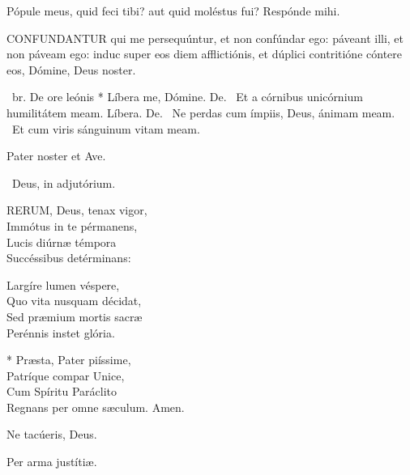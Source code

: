 


 Pópule meus, quid feci tibi? aut quid moléstus fui? Respónde mihi.


\lettrine[lines=2]{C}{ONFUNDANTUR} qui me persequúntur, et non confúndar ego: páveant illi, et non páveam ego: induc super eos diem afflictiónis, et dúplici contritióne cóntere eos, Dómine, Deus noster.

\R\ br. De ore leónis * Líbera me, Dómine. De. \V\ Et a córnibus unicórnium humilitátem meam. Líbera. De. \V\ Ne perdas cum ímpiis, Deus, ánimam meam. \R\ Et cum viris sánguinum vitam meam.



\sectionornament


Pater noster et Ave.

\V\ Deus, in adjutórium.


\lettrine[lines=2]{R}{ERUM}, Deus, tenax vigor,\\
Immótus in te pérmanens,\\
Lucis diúrnæ témpora\\
Succéssibus detérminans:

Largíre lumen véspere,\\
Quo vita nusquam décidat,\\
Sed præmium mortis sacræ\\
Perénnis instet glória.

* Præsta, Pater piíssime,\\
Patríque compar Unice,\\
Cum Spíritu Paráclito\\
Regnans per omne sæculum. Amen.

  Ne tacúeris, Deus.



 Per arma justítiæ.


